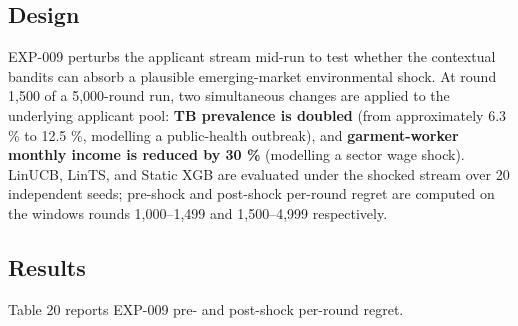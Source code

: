 
\subsection{Design}\label{design-2}

EXP-009 perturbs the applicant stream mid-run to test whether the contextual bandits can absorb a plausible emerging-market environmental shock. At round 1,500 of a 5,000-round run, two simultaneous changes are applied to the underlying applicant pool: \textbf{TB prevalence is doubled} (from approximately 6.3 \% to 12.5 \%, modelling a public-health outbreak), and \textbf{garment-worker monthly income is reduced by 30 \%} (modelling a sector wage shock). LinUCB, LinTS, and Static XGB are evaluated under the shocked stream over 20 independent seeds; pre-shock and post-shock per-round regret are computed on the windows rounds 1,000--1,499 and 1,500--4,999 respectively.

\subsection{Results}\label{results-3}

Table 20 reports EXP-009 pre- and post-shock per-round regret.

\label{tab:5.9.1}

